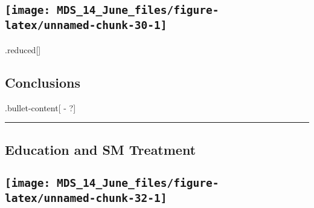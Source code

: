 \documentclass[
]{article}
\begin{document}
\hypertarget{section-12}{%
\subsection{\texorpdfstring{\texttt{[image: MDS\_14\_June\_files/figure-latex/unnamed-chunk-30-1]}}{}}\label{section-12}}

.reduced{[}{]}

\hypertarget{conclusions}{%
\subsection{Conclusions}\label{conclusions}}

.bullet-content{[} - ?{]}

\begin{center}\rule{0.5\linewidth}{0.5pt}\end{center}

\hypertarget{education-and-sm-treatment}{%
\subsection{Education and SM
Treatment}\label{education-and-sm-treatment}}

\hypertarget{section-13}{%
\subsection{\texorpdfstring{\texttt{[image: MDS\_14\_June\_files/figure-latex/unnamed-chunk-32-1]}}{}}\label{section-13}}
\end{document}
